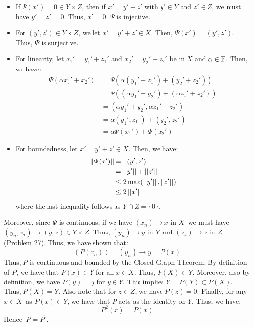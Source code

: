 \documentclass[12pt]{article}
\begin{document}
\begin{solution}
    \begin{itemize}
        \item If $\Psi(x') = 0 \in Y \times Z$, then if $x' = y' + z'$ with $y' \in Y$ and $z' \in Z$, we must have $y' = z' = 0$. Thus, $x' = 0$. $\Psi$ is injective. 
        \item For $(y', z') \in Y \times Z$, we let $x' = y'+z' \in X$. Then, $\Psi(x') = (y', z')$. Thus, $\Psi$ is surjective. 
        \item For linearity, let $x_1' = y_1' + z_1'$ and $x_2' = y_2' + z_2'$ be in $X$ and $\alpha \in \mathbb F$. Then, we have:
        \begin{align*}
            \Psi(\alpha x_1' + x_2') &= \Psi(\alpha(y_1' + z_1') + (y_2' + z_2')) \\
            &= \Psi((\alpha y_1' + y_2') + (\alpha z_1' + z_2')) \\
            &= (\alpha y_1' + y_2', \alpha z_1' + z_2') \\
            &= \alpha(y_1', z_1') + (y_2', z_2') \\
            &= \alpha \Psi(x_1') + \Psi(x_2')
        \end{align*}
        \item For boundedness, let $x' = y' + z' \in X$. Then, we have:
        \begin{align*}
            \left\vert\left\vert\Psi(x')\right\vert\right\vert &= \left\vert\left\vert(y', z')\right\vert\right\vert \\
            &= \left\vert\left\vert y'\right\vert\right\vert + \left\vert\left\vert z'\right\vert\right\vert \\
            &\leq 2\max(\left\vert\left\vert y'\right\vert\right\vert, \left\vert\left\vert z'\right\vert\right\vert) \\
            &\leq 2\left\vert\left\vert x'\right\vert\right\vert
        \end{align*}
        where the last inequality follows as $Y \cap Z = \{0\}$.
    \end{itemize}
    Moreover, since $\Psi$ is continuous, if we have $(x_n) \to x$ in $X$, we must have $(y_n, z_n) \to (y, z) \in Y \times Z$. Thus, $(y_n) \to y$ in $Y$ and $(z_n) \to z$ in $Z$ (Problem 27). Thus, we have shown that: 
    \[ (P(x_n)) = (y_n) \to y = P(x)\]
    Thus, $P$ is continuous and bounded by the Closed Graph Theorem. \bbni    
    By definition of $P$, we have that $P(x) \in Y$ for all $x \in X$. Thus, $P(X) \subset Y$. Moreover, also by definition, we have $P(y) = y$ for $y \in Y$. This implies $Y = P(Y) \subset P(X)$. Thus, $P(X) = Y$. Also note that for $z \in Z$, we have $P(z) = 0$. \bbni
    Finally, for any $x \in X$, as $P(x) \in Y$, we have that $P$ acts as the identity on $Y$. Thus, we have:
    \[ P^2(x) = P(x)\]
    Hence, $P = P^2$. \bbni

\end{solution}
\end{document}
